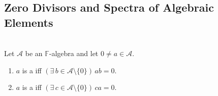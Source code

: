 \subsection{Zero Divisors and Spectra of Algebraic Elements}

\begin{definition} \label{def:algebra-zero-divisors} \\
Let $\mathcal{A}$ be an $\mathbb{F}$-algebra and let $0\neq a\in\mathcal{A}$.
\begin{enumerate}[label=(\roman*)]
\setlength{\itemsep}{0pt}
\item $a$ is a  iff $(\exists\,b\in\mathcal{A}\setminus\{0\})\,ab=0$.
\item $a$ is a  iff $(\exists\,c\in\mathcal{A}\setminus\{0\})\,ca=0$.
\end{enumerate}
\end{definition}

